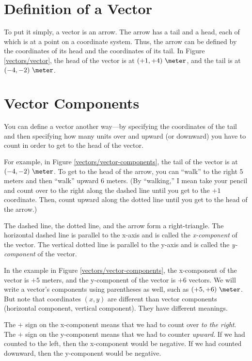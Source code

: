 
\section*{Definition of a Vector}

To put it simply, a vector is an arrow. The arrow has a tail and a head, each of which is at a point on a coordinate system. Thus, the arrow can be defined by the coordinates of its head and the coordinates of its tail. In Figure \ref{vectors/vector}, the head of the vector is at $(+1,+4)\ \meter$, and the tail is at $(-4,-2)\ \meter$.



\section*{Vector Components}

You can define a vector another way---by specifying the coordinates of the tail and then specifying how many units over and upward (or downward) you have to count in order to get to the head of the vector. 

For example, in Figure \ref{vectors/vector-components}, the tail of the vector is at $(-4,-2)\ \meter$. To get to the head of the arrow, you can ``walk'' to the right 5 meters and then ``walk'' upward 6 meters. (By ``walking,'' I mean take your pencil and count over to the right along the dashed line until you get to the $+1$ coordinate. Then, count upward along the dotted line until you get to the head of the arrow.)


The dashed line, the dotted line, and the arrow form a right-triangle. The horizontal dashed line is parallel to the x-axis and is called the \emph{x-component} of the vector. The vertical dotted line is parallel to the y-axis and is called the \emph{y-component} of the vector. 

In the example in Figure \ref{vectors/vector-components}, the x-component of the vector is $+5$ meters, and the y-component of the vector is $+6$ vectors. We will write a vector's components using parentheses as well, such as $(+5,+6)\ \meter$. But note that coordinates $(x,y)$ are different than vector components (horizontal component, vertical component). They have different meanings.

The $+$ sign on the x-component means that we had to count over \emph{to the right}. The $+$ sign on the y-component means that we had to counter \emph{upward}. If we had counted to the left, then the x-component would be negative. If we had counted downward, then the y-component would be negative. 

